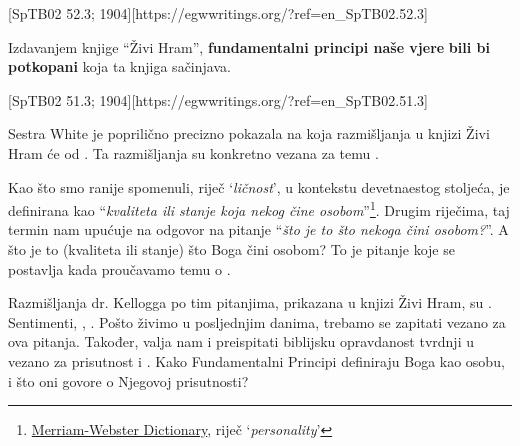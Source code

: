 [SpTB02 52.3; 1904][https://egwwritings.org/?ref=en\_SpTB02.52.3]

Izdavanjem knjige “Živi Hram”, \textbf{fundamentalni principi naše vjere} \textbf{bili bi potkopani}  koja ta knjiga sačinjava.

[SpTB02 51.3; 1904][https://egwwritings.org/?ref=en\_SpTB02.51.3]

Sestra White je poprilično precizno pokazala na koja razmišljanja u knjizi Živi Hram će  od . Ta razmišljanja su konkretno vezana za temu .

Kao što smo ranije spomenuli, riječ ‘\textit{ličnost}’, u kontekstu devetnaestog stoljeća, je definirana kao “\textit{kvaliteta ili stanje koja nekog čine osobom}”\footnote{\href{https://www.merriam-webster.com/dictionary/personality}{Merriam-Webster Dictionary}, riječ ‘\textit{personality}’}. Drugim riječima, taj termin nam upućuje na odgovor na pitanje “\textit{što je to što nekoga čini osobom?}”. A što je to (kvaliteta ili stanje) što Boga čini osobom? To je pitanje koje se postavlja kada proučavamo temu o .

Razmišljanja dr. Kellogga po tim pitanjima, prikazana u knjizi Živi Hram, su . Sentimenti, , . Pošto živimo u posljednjim danima, trebamo se zapitati vezano za ova pitanja. Također, valja nam i preispitati biblijsku opravdanost tvrdnji u  vezano za prisutnost i . Kako Fundamentalni Principi definiraju Boga kao osobu, i što oni govore o Njegovoj prisutnosti?

